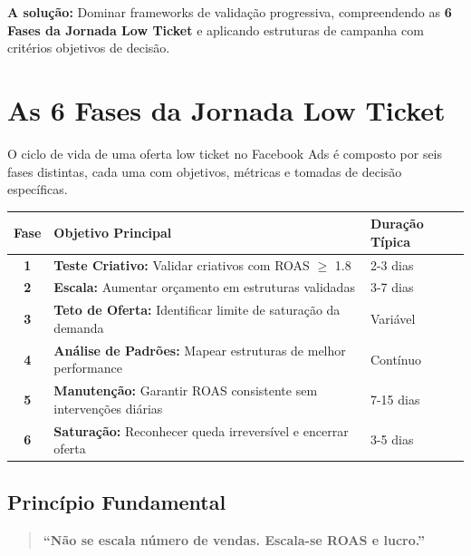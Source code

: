 \documentclass[12pt, a4paper]{article}
\begin{document}
\textcolor{accentColor}{\textbf{A solução:}} Dominar frameworks de validação progressiva, compreendendo as \textbf{6 Fases da Jornada Low Ticket} e aplicando estruturas de campanha com critérios objetivos de decisão.

\needspace{8cm}

\section{As 6 Fases da Jornada Low Ticket}

O ciclo de vida de uma oferta low ticket no Facebook Ads é composto por seis fases distintas, cada uma com objetivos, métricas e tomadas de decisão específicas.

\begin{table}[H]
    \centering
    \small
    \renewcommand{\arraystretch}{1.5}
    \begin{tabularx}{\textwidth}{c X X}
        \toprule
        \rowcolor{tableHeader} \textbf{Fase} & \textbf{Objetivo Principal} & \textbf{Duração Típica} \\
        \midrule
        \textbf{1} & \textbf{Teste Criativo:} Validar criativos com ROAS $\geq$ 1.8 & 2-3 dias \\
        \rowcolor{lightGray}
        \textbf{2} & \textbf{Escala:} Aumentar orçamento em estruturas validadas & 3-7 dias \\
        \textbf{3} & \textbf{Teto de Oferta:} Identificar limite de saturação da demanda & Variável \\
        \rowcolor{lightGray}
        \textbf{4} & \textbf{Análise de Padrões:} Mapear estruturas de melhor performance & Contínuo \\
        \textbf{5} & \textbf{Manutenção:} Garantir ROAS consistente sem intervenções diárias & 7-15 dias \\
        \rowcolor{lightGray}
        \textbf{6} & \textbf{Saturação:} Reconhecer queda irreversível e encerrar oferta & 3-5 dias \\
        \bottomrule
    \end{tabularx}
\end{table}

\subsection{Princípio Fundamental}

\begin{quote}
\textcolor{primaryColor}{\textbf{``Não se escala número de vendas. Escala-se ROAS e lucro.''}}
\end{quote}
\end{document}

